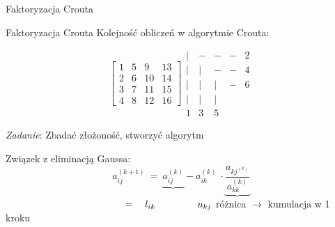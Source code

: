 \begin{frame}{Faktoryzacja Crouta}
\begin{flushright}
\end{flushright}
\begin{flushright}
\end{flushright}
\begin{flushright}
\end{flushright}
\begin{flushright}
\end{flushright}
\begin{flushright}
\end{flushright}

\begin{flushright}
\end{flushright}
\begin{flushright}
\end{flushright}
\end{frame}
\begin{frame}{Faktoryzacja Crouta}
Kolejność obliczeń w algorytmie Crouta:

$$
\begin{bmatrix}
1 & 5 & 9 & 13\\
2 & 6 & 10 & 14\\
3 & 7 & 11 & 15\\
4 & 8 & 12 & 16
\end{bmatrix}
\begin{array}{lllll}
| & - & - &- & 2 \\
| & | & - & - & 4 \\
| & | & | & - & 6 \\
| & | & | \\
1 & 3 & 5 
\end{array}
$$
\begin{flushright}

{\it Zadanie}: Zbadać złożoność, stworzyć algorytm
\end{flushright}
Związek z eliminacją Gaussa:
$$
a_{ij}^{(k+1)}\ =\ \underbrace{a_{ij}^{(k)}} -a_{ik}^{(k)}\ \cdot \underbrace{\frac{a_{kj^{(k)}}}{a_{kk}^{(k)}}}
$$
$ \hspace{43mm} =\ \ \  l_{ik}\ \ \ \ \ \ \ \ \ \ \ \ \ u_{kj}
$
\newline \hspace*{30mm} różnica $\rightarrow$ kumulacja w 1 kroku

\end{frame}
